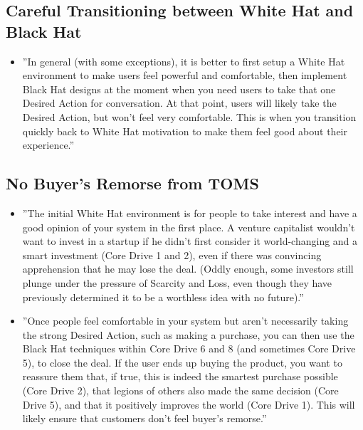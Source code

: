 \subsection{Careful Transitioning between White Hat and Black Hat}
\begin{itemize}
    \item ''In general (with some exceptions), it is better to first setup a White Hat environment to make users feel powerful and comfortable, then implement Black Hat designs at the moment when you need users to take that one Desired Action for conversation. At that point, users will likely take the Desired Action, but won't feel very comfortable. This is when you transition quickly back to White Hat motivation to make them feel good about their experience.''
\end{itemize}

\subsection{No Buyer's Remorse from TOMS}
\begin{itemize}
    \item ''The initial White Hat environment is for people to take interest and have a good opinion of your system in the first place. A venture capitalist wouldn't want to invest in a startup if he didn't first consider it world-changing and a smart investment (Core Drive 1 and 2), even if there was convincing apprehension that he may lose the deal. (Oddly enough, some investors still plunge under the pressure of Scarcity and Loss, even though they have previously determined it to be a worthless idea with no future).''
    \item ''Once people feel comfortable in your system but aren't necessarily taking the strong Desired Action, such as making a purchase, you can then use the Black Hat techniques within Core Drive 6 and 8 (and sometimes Core Drive 5), to close the deal. If the user ends up buying the product, you want to reassure them that, if true, this is indeed the smartest purchase possible (Core Drive 2), that legions of others also made the same decision (Core Drive 5), and that it positively improves the world (Core Drive 1). This will likely ensure that customers don't feel buyer's remorse.''
\end{itemize}

